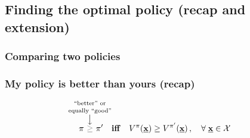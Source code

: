 \subsection{Finding the optimal policy (recap and extension)}

\subsubsection{Comparing two policies}

\begin{frame}\frametitle{My policy is better than yours (recap)}

\begin{equation}
\pi~
\overset{\mathclap{\substack{%
					\text{``better'' or}\\[1mm]\text{equally ``good''}\\ \big\downarrow
					}}}{{\color{gray}\ge}}
~\pi' 
\quad \text{\textbf{iff}} \quad V^{\pi} (\vec x) \ge V^{\pi'} (\vec x)\,,\quad \forall\; \vec x \in \mathcal{X}
\end{equation}

\end{frame}

